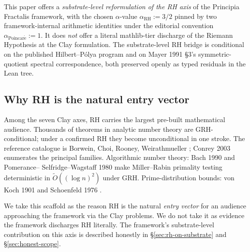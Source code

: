 \documentclass[11pt,a4paper]{article}
\theoremstyle{plain}
\theoremstyle{definition}
\begin{document}
This paper offers a \emph{substrate-level reformulation of the RH
axis} of the Principia Fractalis framework, with the chosen
$\alpha$-value $\alpha_{\mathrm{RH}} := 3/2$ pinned by two framework-internal
arithmetic identities under the editorial convention
$\alpha_{\mathrm{Poincar\acute e}} := 1$. It does \emph{not} offer a
literal mathlib-tier discharge of the Riemann Hypothesis at the Clay
formulation. The substrate-level RH bridge is conditional on the
published Hilbert--P\'olya program and on Mayer 1991 \S3's
symmetric-quotient spectral correspondence, both preserved openly as
typed residuals in the Lean tree.

\medskip

\noindent{}

\subsection{Why RH is the natural entry vector}
\label{sec:entry-vector}

Among the seven Clay axes, RH carries the largest pre-built
mathematical audience. Thousands of theorems in analytic number
theory are GRH-conditional; under a confirmed RH they become
unconditional in one stroke. The reference catalogue is Borwein,
Choi, Rooney, Weirathmueller \cite{borwein_choi_rooney_weirathmueller2008};
Conrey 2003 \cite{conrey2003} enumerates the principal families.
Algorithmic number theory: Bach 1990 \cite{bach1990} and Pomerance--%
Selfridge--Wagstaff 1980 \cite{pomerance_selfridge_wagstaff1980}
make Miller--Rabin primality testing deterministic in
$\widetilde O((\log n)^2)$ under GRH. Prime-distribution bounds:
von Koch 1901 \cite{vonkoch1901} and Schoenfeld 1976
\cite{schoenfeld1976}.

We take this scaffold as the reason RH is the natural \emph{entry
vector} for an audience approaching the framework via the Clay
problems. We do not take it as evidence the framework discharges RH
literally. The framework's substrate-level contribution on this axis
is described honestly in \S\ref{sec:rh-on-substrate} and
\S\ref{sec:honest-scope}.
\end{document}
